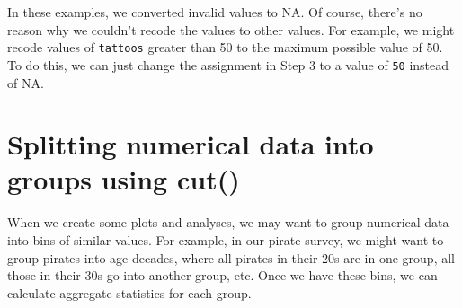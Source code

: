 \documentclass{tufte-book}\usepackage[]{graphicx}\usepackage[]{color}
\makeatletter
\newcommand{\hlstr}[1]{\textcolor[rgb]{0.192,0.494,0.8}{#1}}%
\newcommand{\hlopt}[1]{\textcolor[rgb]{0,0,0}{#1}}%
\newcommand{\hlstd}[1]{\textcolor[rgb]{0.345,0.345,0.345}{#1}}%
\newcommand{\hlkwc}[1]{\textcolor[rgb]{0.333,0.667,0.333}{#1}}%
\newcommand{\hlkwd}[1]{\textcolor[rgb]{0.737,0.353,0.396}{\textbf{#1}}}%
\newenvironment{kframe}{%
 \def\at@end@of@kframe{}%
 \ifinner\ifhmode%
  \def\at@end@of@kframe{\end{minipage}}%
  \begin{minipage}{\columnwidth}%
 \fi\fi%
 \def\FrameCommand##1{\hskip\@totalleftmargin \hskip-\fboxsep
 \colorbox{shadecolor}{##1}\hskip-\fboxsep
     \hskip-\linewidth \hskip-\@totalleftmargin \hskip\columnwidth}%
 \MakeFramed {\advance\hsize-\width
   \@totalleftmargin\z@ \linewidth\hsize
   \@setminipage}}%
 {\par\unskip\endMakeFramed%
 \at@end@of@kframe}
\newenvironment{knitrout}{}{} %
\makeatother
\begin{document}
\begin{footnotesize}

In these examples, we converted invalid values to NA. Of course, there's no reason why we couldn't recode the values to other values. For example, we might recode values of \texttt{tattoos} greater than 50 to the maximum possible value of 50. To do this, we can just change the assignment in Step 3 to a value of \texttt{50} instead of NA.


\section{Splitting numerical data into groups using cut()}

When we create some plots and analyses, we may want to group numerical data into bins of similar values. For example, in our pirate survey, we might want to group pirates into age decades, where all pirates in their 20s are in one group, all those in their 30s go into another group, etc. Once we have these bins, we can calculate aggregate statistics for each group.


\end{footnotesize}
\end{document}

